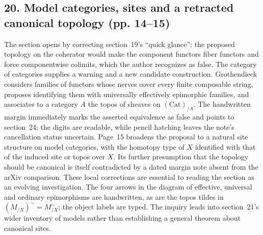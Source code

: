 \documentclass[10pt,oneside]{book}
\begin{document}
\subsection*{20. Model categories, sites and a retracted canonical topology (pp. 14--15)}
The section opens by correcting section~19's ``quick glance'': the proposed topology on the coherator would make the component functors fiber functors and force componentwise colimits, which the author recognizes as false. The category of categories supplies a warning and a new candidate construction. Grothendieck considers families of functors whose nerves cover every finite composable string, proposes identifying them with universally effectively epimorphic families, and associates to a category $A$ the topos of sheaves on $(\mathrm{Cat})_{/A}$. The handwritten margin immediately marks the asserted equivalence as false and points to section~24; the digits are readable, while pencil hatching leaves the note's cancellation status uncertain. Page~15 broadens the proposal to a natural site structure on model categories, with the homotopy type of $X$ identified with that of the induced site or topos over $X$. Its further presumption that the topology should be canonical is itself contradicted by a dated margin note absent from the arXiv comparison. These local corrections are essential to reading the section as an evolving investigation. The four arrows in the diagram of effective, universal and ordinary epimorphisms are handwritten, as are the topos tildes in $(M_{/X})^{\sim}=M^{\sim}_{/X}$; the object labels are typed. The inquiry leads into section~21's wider inventory of models rather than establishing a general theorem about canonical sites.
\end{document}
